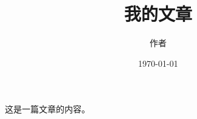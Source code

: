 \documentclass{article}
\title{我的文章}
\author{作者}
\date{\today}
\begin{document}
\maketitle

这是一篇文章的内容。
\end{document}
